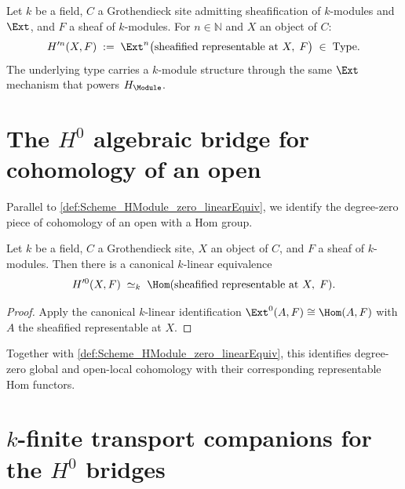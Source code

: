 \begin{definition}\leanok
  \label{def:Scheme_HModule_prime}

  Let \(k\) be a field, \(C\) a Grothendieck site admitting sheafification of \(k\)-modules and \(\Ext\), and \(F\) a sheaf of \(k\)-modules. For \(n \in \mathbb N\) and \(X\) an object of \(C\):
  \[
    H^{\prime n}(X, F) \;:=\; \Ext^n\bigl(\text{sheafified representable at }X,\; F\bigr) \;\in\; \mathrm{Type}.
  \]
  The underlying type carries a \(k\)-module structure through the same \(\Ext\) mechanism that powers \(H_{\Module}\).
\end{definition}

\section{The \(H^0\) algebraic bridge for cohomology of an open}
\label{sec:hmodule_prime_zero}

Parallel to \cref{def:Scheme_HModule_zero_linearEquiv}, we identify the degree-zero piece of cohomology of an open with a Hom group.

\begin{definition}\leanok
  \label{def:Scheme_HModule_prime_zero_linearEquiv}

  Let \(k\) be a field, \(C\) a Grothendieck site, \(X\) an object of \(C\), and \(F\) a sheaf of \(k\)-modules. Then there is a canonical \(k\)-linear equivalence
  \[
    H^{\prime 0}(X, F) \;\simeq_k\; \Hom(\text{sheafified representable at }X,\; F).
  \]
\end{definition}

\begin{proof}

  \leanok
  Apply the canonical \(k\)-linear identification \(\Ext^0(A,F) \cong \Hom(A,F)\) with \(A\) the sheafified representable at \(X\).
\end{proof}

Together with \cref{def:Scheme_HModule_zero_linearEquiv}, this identifies degree-zero global and open-local cohomology with their corresponding representable Hom functors.

\section{\(k\)-finite transport companions for the \(H^0\) bridges}
\label{sec:HModule_finite_zero_iter038}

